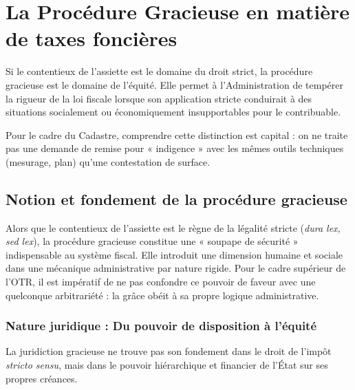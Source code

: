 \documentclass[Cours_contentieuxTF2026.tex]{subfiles}
\begin{document}
	
	\chapter{La Procédure Gracieuse en matière de taxes foncières}
	
	
	Si le contentieux de l'assiette est le domaine du droit strict, la procédure gracieuse est le domaine de l'équité. Elle permet à l'Administration de tempérer la rigueur de la loi fiscale lorsque son application stricte conduirait à des situations socialement ou économiquement insupportables pour le contribuable.
	
	Pour le cadre du Cadastre, comprendre cette distinction est capital : on ne traite pas une demande de remise pour « indigence » avec les mêmes outils techniques (mesurage, plan) qu'une contestation de surface.
	
	\section{Notion et fondement de la procédure gracieuse}
	
	Alors que le contentieux de l'assiette est le règne de la légalité stricte (\textit{dura lex, sed lex}), la procédure gracieuse constitue une « soupape de sécurité » indispensable au système fiscal. Elle introduit une dimension humaine et sociale dans une mécanique administrative par nature rigide. Pour le cadre supérieur de l'OTR, il est impératif de ne pas confondre ce pouvoir de faveur avec une quelconque arbitrariété : la grâce obéit à sa propre logique administrative.
	
	\subsection{Nature juridique : Du pouvoir de disposition à l'équité}
	
	La juridiction gracieuse ne trouve pas son fondement dans le droit de l'impôt \textit{stricto sensu}, mais dans le pouvoir hiérarchique et financier de l'État sur ses propres créances.
	
\end{document}
